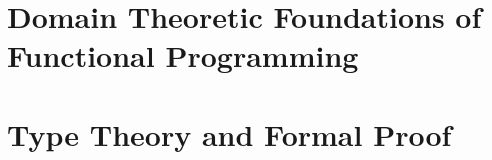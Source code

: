 \documentclass[11pt, oneside, openany]{book}
\begin{document}
\part{Domain Theoretic Foundations of Functional Programming}

 

 
 
 
 

\part{Type Theory and Formal Proof}
\end{document}
